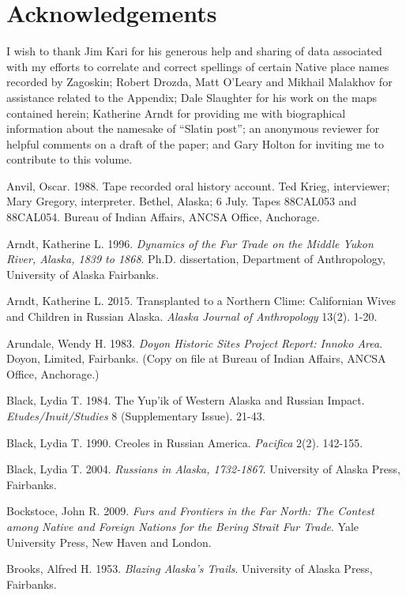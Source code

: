 \section*{Acknowledgements}
I wish to thank Jim Kari for his generous help and sharing of data associated with my efforts to correlate and correct spellings of certain Native place names recorded by Zagoskin; Robert Drozda, Matt O’Leary and Mikhail Malakhov for assistance related to the Appendix; Dale Slaughter for his work on the maps contained herein; Katherine Arndt for providing me with biographical information about the namesake of “Slatin post”; an anonymous reviewer for helpful comments on a draft of the paper; and Gary Holton for inviting me to contribute to this volume.


\begin{hang}

Anvil, Oscar. 1988. Tape recorded oral history account. Ted Krieg, interviewer; Mary Gregory, interpreter. Bethel, Alaska; 6 July. Tapes 88CAL053 and 88CAL054. Bureau of Indian Affairs, ANCSA Office, Anchorage.

Arndt, Katherine L. 1996. \textit{Dynamics of the Fur Trade on the Middle Yukon River, Alaska, 1839 to 1868}. Ph.D. dissertation, Department of Anthropology, University of Alaska Fairbanks.

Arndt, Katherine L. 2015. Transplanted to a Northern Clime: Californian Wives and Children in Russian Alaska. \textit{Alaska Journal of Anthropology} 13(2). 1-20.

Arundale, Wendy H. 1983. \textit{Doyon Historic Sites Project Report: Innoko Area}. Doyon, Limited, Fairbanks. (Copy on file at Bureau of Indian Affairs, ANCSA Office, Anchorage.)

Black, Lydia T. 1984. The Yup’ik of Western Alaska and Russian Impact. \textit{Etudes/Inuit/Studies} 8 (Supplementary Issue). 21-43.

Black, Lydia T. 1990. Creoles in Russian America. \textit{Pacifica} 2(2). 142-155.

Black, Lydia T. 2004.	\textit{Russians in Alaska, 1732-1867}. University of Alaska Press, Fairbanks.

Bockstoce, John R. 2009. \textit{Furs and Frontiers in the Far North: The Contest among Native and Foreign Nations for the Bering Strait Fur Trade}. Yale University Press, New  Haven and London.

Brooks, Alfred H. 1953. \textit{Blazing Alaska’s Trails}. University of Alaska Press, Fairbanks.


\end{hang}
